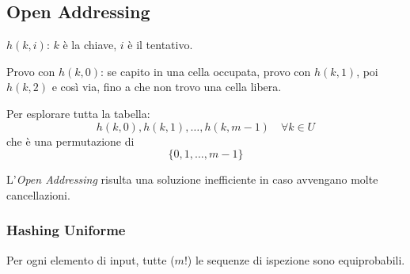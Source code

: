 \subsection{Open Addressing} \label{hash:openaddessing}

$h(k,i)$: $k$ è la chiave, $i$ è il tentativo.\par
Provo con $h(k,0)$: se capito in una cella occupata, provo con $h(k,1)$, poi $h(k,2)$
e così via, fino a che non trovo una cella libera.

Per esplorare tutta la tabella:
$$h(k,0), h(k,1), \dots, h(k,m-1) \quad \forall k \in U$$
che è una permutazione di 
$$\{0,1,\dots,m-1\}$$




L'\emph{Open Addressing} risulta una soluzione inefficiente in caso
avvengano molte cancellazioni.

\subsubsection{Hashing Uniforme}

Per ogni elemento di input, tutte ($m!$) le sequenze di ispezione
sono equiprobabili.

